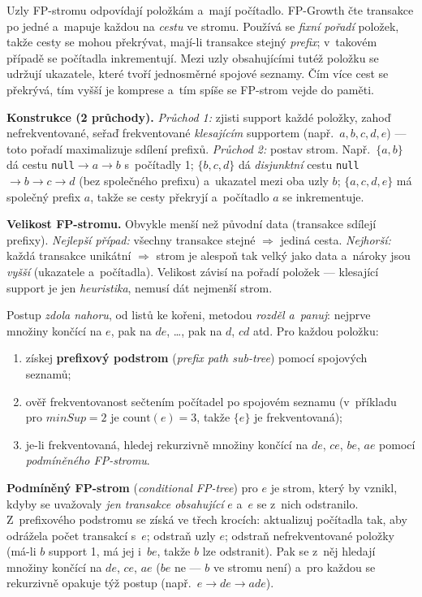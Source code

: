 \documentclass[11pt,a4paper]{article}
\theoremstyle{definition}
\begin{document}
\begin{defbox}[FP-strom]
Uzly FP-stromu odpovídají položkám a~mají počítadlo. FP-Growth čte transakce po jedné
a~mapuje každou na \emph{cestu} ve stromu. Používá se \emph{fixní pořadí} položek, takže
cesty se mohou překrývat, mají-li transakce stejný \emph{prefix}; v~takovém případě se
počítadla inkrementují. Mezi uzly obsahujícími tutéž položku se udržují ukazatele, které
tvoří jednosměrné spojové seznamy. Čím více cest se překrývá, tím vyšší je komprese
a~tím spíše se FP-strom vejde do paměti.
\end{defbox}

\textbf{Konstrukce (2 průchody).} \emph{Průchod 1:} zjisti support každé položky, zahoď
nefrekventované, seřaď frekventované \emph{klesajícím} supportem (např.\ $a,b,c,d,e$) --- toto
pořadí maximalizuje sdílení prefixů. \emph{Průchod 2:} postav strom. Např.\ $\{a,b\}$ dá cestu
\texttt{null}$\to a\to b$ s~počítadly 1; $\{b,c,d\}$ dá \emph{disjunktní} cestu
\texttt{null}$\to b\to c\to d$ (bez společného prefixu) a~ukazatel mezi oba uzly $b$;
$\{a,c,d,e\}$ má společný prefix $a$, takže se cesty překryjí a~počítadlo $a$ se inkrementuje.

\textbf{Velikost FP-stromu.} Obvykle menší než původní data (transakce sdílejí prefixy).
\emph{Nejlepší případ:} všechny transakce stejné $\Rightarrow$ jediná cesta. \emph{Nejhorší:}
každá transakce unikátní $\Rightarrow$ strom je alespoň tak velký jako data a~nároky jsou
\emph{vyšší} (ukazatele a~počítadla). Velikost závisí na pořadí položek --- klesající support
je jen \emph{heuristika}, nemusí dát nejmenší strom.

\begin{defbox}
Postup \emph{zdola nahoru}, od listů ke kořeni, metodou \emph{rozděl a~panuj}: nejprve množiny
končící na $e$, pak na $de$, \dots, pak na $d$, $cd$ atd. Pro každou položku:
\begin{enumerate}
\item získej \textbf{prefixový podstrom} (\emph{prefix path sub-tree}) pomocí spojových seznamů;
\item ověř frekventovanost sečtením počítadel po spojovém seznamu (v~příkladu pro
      $\mathit{minSup}=2$ je $\mathrm{count}(e)=3$, takže $\{e\}$ je frekventovaná);
\item je-li frekventovaná, hledej rekurzivně množiny končící na $de$, $ce$, $be$, $ae$ pomocí
      \emph{podmíněného FP-stromu}.
\end{enumerate}

\textbf{Podmíněný FP-strom} (\emph{conditional FP-tree}) pro $e$ je strom, který by vznikl, kdyby
se uvažovaly \emph{jen transakce obsahující} $e$ a~$e$ se z~nich odstranilo. Z~prefixového
podstromu se získá ve třech krocích: aktualizuj počítadla tak, aby odrážela počet transakcí
s~$e$; odstraň uzly $e$; odstraň nefrekventované položky (má-li $b$ support 1, má jej i~$be$,
takže $b$ lze odstranit). Pak se z~něj hledají množiny končící na $de$, $ce$, $ae$ ($be$ ne ---
$b$ ve stromu není) a~pro každou se rekurzivně opakuje týž postup (např.\ $e\to de\to ade$).
\end{defbox}
\end{document}
